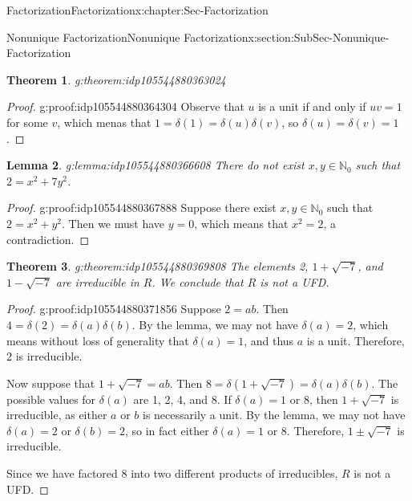 \documentclass[oneside,10pt,]{book}
\numberwithin{equation}{section}
\def\N{{\mathbb N}}
\newtheorem{theorem}{Theorem}[section]
\newtheorem{lemma}[theorem]{Lemma}
\begin{document}
\begin{chapterptx}{Factorization}{}{Factorization}{}{}{x:chapter:Sec-Factorization}
\begin{sectionptx}{Nonunique Factorization}{}{Nonunique Factorization}{}{}{x:section:SubSec-Nonunique-Factorization}
\begin{theorem}{}{}{g:theorem:idp105544880363024}
\end{theorem}
\begin{proof}{}{g:proof:idp105544880364304}
Observe that \(u\) is a unit if and only if \(uv = 1\) for some \(v\), which menas that \(1 = \delta(1) = \delta(u) \delta(v)\), so \(\delta(u) = \delta(v) = 1\).%
\end{proof}
\begin{lemma}{}{}{g:lemma:idp105544880366608}%
There do not exist \(x,y\in \N_0\) such that \(2 = x^2 + 7y^2\).%
\end{lemma}
\begin{proof}{}{g:proof:idp105544880367888}
Suppose there exist \(x,y\in \N_0\) such that \(2 = x^2 + y^2\). Then we must have \(y = 0\), which means that \(x^2 = 2\), a contradiction.%
\end{proof}
\begin{theorem}{}{}{g:theorem:idp105544880369808}%
The elements 2, \(1+ \sqrt{-7}\), and \(1-\sqrt{-7}\) are irreducible in \(R\). We conclude that \(R\) is not a UFD.%
\end{theorem}
\begin{proof}{}{g:proof:idp105544880371856}
Suppose \(2 = ab\). Then \(4 = \delta(2) = \delta(a)\delta(b)\). By the lemma, we may not have \(\delta(a) = 2\), which means without loss of generality that \(\delta(a) = 1\), and thus \(a\) is a unit. Therefore, 2 is irreducible.%
\par
Now suppose that \(1 + \sqrt{-7} = ab\). Then \(8 = \delta(1+\sqrt{-7}) = \delta(a) \delta(b)\). The possible values for \(\delta(a)\) are 1, 2, 4, and 8. If \(\delta(a) = 1\) or 8, then \(1+\sqrt{-7}\) is irreducible, as either \(a\) or \(b\) is necessarily a unit. By the lemma, we may not have \(\delta(a) = 2\) or \(\delta(b) = 2\), so in fact either \(\delta(a) = 1\) or 8. Therefore, \(1\pm \sqrt{-7}\) is irreducible.%
\par
Since we have factored 8 into two different products of irreducibles, \(R\) is not a UFD.%
\end{proof}
\end{sectionptx}
\end{chapterptx}
%
%
\typeout{************************************************}
\typeout{************************************************}
%
\end{document}
